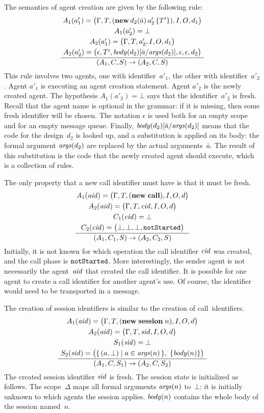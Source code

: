 \documentclass[a4paper,12pt,oneside,fleqn]{book} %
\newcommand{\on}[2]{\genfrac{}{}{0pt}{0}{\strut#1}{\strut#2}}
\begin{document}
The semantics of agent creation are given by the following rule:
\begin{align}
\frac
  {\on{A_1(a'_1)=\bigl(\Gamma,T,({\bf new}\,d_2(\bar{a})\,a'_2\,\{T'\}),I,O,d_1\bigr)}
  {\on{A_1(a'_2)=\bot}
  {\on{A_2(a'_1)=\bigl(\Gamma,T,a'_2,I,O,d_1\bigr)}
  {A_2(a'_2)=\bigl(\epsilon,T',{\it body}(d_2)[\bar{a}/{\it
  args}(d_2)],\epsilon,\epsilon, d_2\bigr)}}}}
  {(A_1,C,S)\to(A_2,C,S)}
\label{eq:opsem-newagent}
\end{align}
This rule involves two agents, one with identifier~$a'_1$, the other with
identifier~$a'_2$. Agent $a'_1$ is executing an agent creation statement.
Agent $a'_2$ is the newly created agent. The hypothesis $A_1(a'_2)=\bot$
says that the identifier~$a'_2$ is fresh. Recall that the agent name is
optional in the grammar: if it is missing, then some fresh identifier will
be chosen.  The notation $\epsilon$ is used both for an empty scope and for
an empty message queue. Finally, ${\it body}(d_2)[\bar{a}/{\it args}(d_2)]$
means that the code for the design~$d_2$ is looked up, and a substitution is
applied on its body: the formal argument ${\it args}(d_2)$ are replaced by
the actual arguments~$\bar a$. The result of this substitution is the code
that the newly created agent should execute, which is a collection of rules.

The only property that a new call identifier must have is that it must be
fresh.
\begin{align}
\frac
  {\on{A_1({\it aid})=\bigl(\Gamma,T,({\bf new}\;{\bf call}),I,O,d\bigr)}
  {\on{A_2({\it aid})=\bigl(\Gamma,T,{\it cid},I,O,d\bigr)}
  {\on{C_1({\it cid})=\bot}
      {C_2({\it cid})=\bigl(\bot,\bot,\bot,{\tt notStarted}\bigr)}}}}
  {(A_1,C_1,S)\to(A_2,C_2,S)}
\end{align}
Initially, it is not known for which operation the call identifier $\it
cid$ was created, and the call phase is $\tt notStarted$. More
interestingly, the sender agent is not necessarily the agent~$\it aid$ that
created the call identifier. It is possible for one agent to create a call
identifier for another agent's use. Of course, the identifier would need
to be transported in a message.

The creation of session identifiers is similar to the creation of
call~identifiers.
\begin{align}
\frac
  {\on{A_1({\it aid})=\bigl(\Gamma,T,({\bf new}\;{\bf session}\;n),I,O,d\bigr)}
  {\on{A_2({\it aid})=\bigl(\Gamma,T,{\it sid},I,O,d\bigr)}
  {\on{S_1({\it sid})=\bot}
      {S_2({\it sid})=\bigl(\{\,(a,\bot)\mid a\in{\it args}(n)\,\},\;
        \{{\it body}(n)\}\bigr)}}}}
  {(A_1,C,S_1)\to(A_2,C,S_2)}
\end{align}
The created session identifier $\it sid$ is fresh. The session state is
initialized as follows. The scope~$\Delta$ maps all formal arguments ${\it
args}(n)$ to~$\bot$: it is initially unknown to which agents the session
applies. ${\it body}(n)$ contains the whole body of the session named~$n$.
\end{document}
